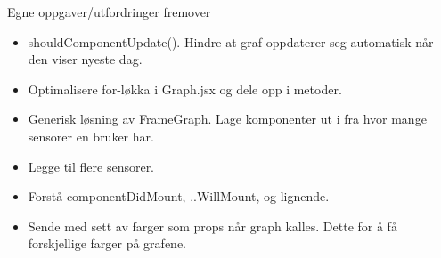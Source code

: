 \documentclass[12pt, oneside]{article}
\begin{document}
Egne oppgaver/utfordringer fremover
\begin{itemize}
\item shouldComponentUpdate(). Hindre at graf oppdaterer seg automatisk når den viser nyeste dag.
\item Optimalisere for-løkka i Graph.jsx og dele opp i metoder.
\item Generisk løsning av FrameGraph. Lage komponenter ut i fra hvor mange sensorer en bruker har. 
\item Legge til flere sensorer.
\item Forstå componentDidMount, ..WillMount, og lignende.
\item Sende med sett av farger som props når graph kalles. Dette for å få forskjellige farger på grafene.
\end{itemize}


\end{document}
